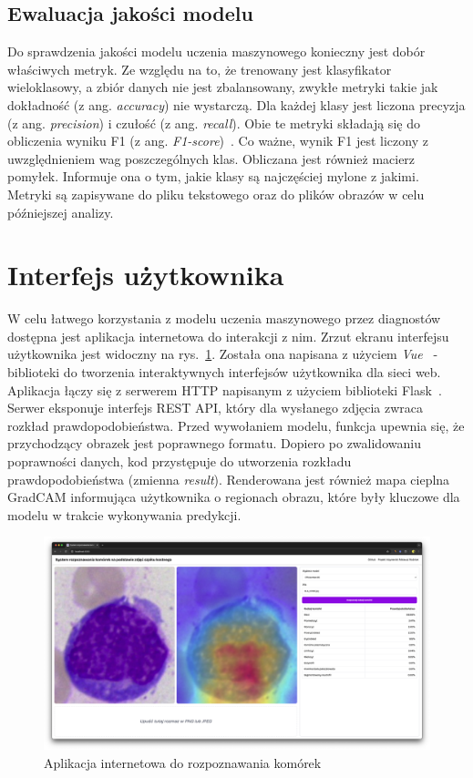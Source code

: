 \subsection{Ewaluacja jakości modelu}

Do sprawdzenia jakości modelu uczenia maszynowego konieczny jest dobór właściwych metryk.
Ze względu na to, że trenowany jest klasyfikator wieloklasowy, a zbiór danych nie jest zbalansowany, zwykłe metryki takie jak dokładność (z ang. \textit{accuracy}) nie wystarczą.
Dla każdej klasy jest liczona precyzja (z ang. \textit{precision}) i czułość (z ang. \textit{recall}).
Obie te metryki składają się do obliczenia wyniku F1 (z ang. \textit{F1-score})~\cite{geron}.
Co ważne, wynik F1 jest liczony z uwzględnieniem wag poszczególnych klas.
Obliczana jest również macierz pomyłek.
Informuje ona o tym, jakie klasy są najczęściej mylone z jakimi.
Metryki są zapisywane do pliku tekstowego oraz do plików obrazów w celu późniejszej analizy.


\section{Interfejs użytkownika}

W celu łatwego korzystania z modelu uczenia maszynowego przez diagnostów dostępna jest aplikacja internetowa do interakcji z nim.
Zrzut ekranu interfejsu użytkownika jest widoczny na rys.~\ref{fig:ui}.
Została ona napisana z użyciem \textit{Vue}~\cite{vue} - biblioteki do tworzenia interaktywnych interfejsów użytkownika dla sieci web.
Aplikacja łączy się z serwerem HTTP napisanym z użyciem biblioteki Flask~\cite{flask}.
Serwer eksponuje interfejs REST API, który dla wysłanego zdjęcia zwraca rozkład prawdopodobieństwa.
Przed wywołaniem modelu, funkcja upewnia się, że przychodzący obrazek jest poprawnego formatu.
Dopiero po zwalidowaniu poprawności danych, kod przystępuje do utworzenia rozkładu prawdopodobieństwa (zmienna \textit{result}).
Renderowana jest również mapa cieplna GradCAM informująca użytkownika o regionach obrazu, które były kluczowe dla modelu w trakcie wykonywania predykcji.


\begin{figure}
    \centering
    \includegraphics[width=\textwidth]{app}
    \caption{Aplikacja internetowa do rozpoznawania komórek}
    \label{fig:ui}
\end{figure}


